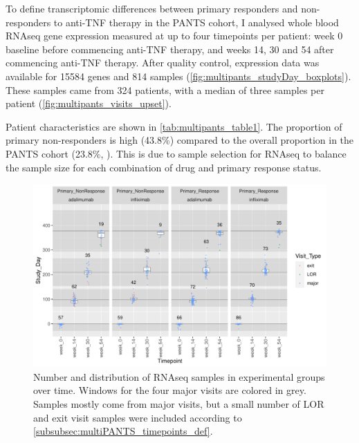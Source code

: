 To define transcriptomic differences between primary responders and non-responders to anti-\gls{TNF} therapy in the \gls{PANTS} cohort, 
I analysed whole blood \gls{RNAseq} gene expression measured at up to four timepoints per patient:
week 0 baseline before commencing anti-\gls{TNF} therapy, and weeks 14, 30 and 54 after commencing anti-\gls{TNF} therapy.
After quality control, expression data was available for 15584 genes and 814 samples (\autoref{fig:multipants_studyDay_boxplots}).
These samples came from 324 patients, with a median of three samples per patient (\autoref{fig:multipants_visits_upset}).

Patient characteristics are shown in \autoref{tab:multipants_table1}.
The proportion of primary non-responders is high (43.8\%) compared to the overall proportion in the \gls{PANTS} cohort (23.8\%, \autocite{kennedy2019PredictorsAntiTNFTreatment}).
This is due to sample selection for \gls{RNAseq} to balance the sample size for each combination of drug and primary response status.

\begin{figure}
    \centering
    \includegraphics[width=1.0\textwidth,page=1]{mainmatter/figures/chapter_04/process_pheno.pheno_filtered_dge.Study_Day_vs_Visit_Label.pdf}
    \caption{Number and distribution of \gls{RNAseq} samples in experimental groups over time. Windows for the four major visits are colored in grey. Samples mostly come from major visits, but a small number of \gls{LOR} and exit visit samples were included according to \autoref{subsubsec:multiPANTS_timepoints_def}.}
    \label{fig:multipants_studyDay_boxplots}
\end{figure}

